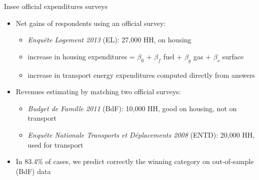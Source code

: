 \documentclass[aspectratio=169,9pt,dvipsnames]{beamer}
\begin{document}
    

\begin{frame}{Insee official expenditures surveys}
    \label{insee}
\begin{itemize}
    \item Net gains of respondents using an official survey: 
    \begin{itemize}
        \item \textit{Enquête Logement 2013} (EL): 27,000 HH, on housing
        \item increase in housing expenditures = $\beta_0$ + $\beta_f$ fuel + $\beta_g$ gas + $\beta_s$ surface \hyperlink{reg_housing}{}
        \item increase in transport energy expenditures computed directly from answers
    \end{itemize}
    \item Revenues estimating by matching two official surveys:
    \begin{itemize}
        \item \textit{Budget de Famille 2011} (BdF): 10,000 HH, good on housing, not on transport
        \item \textit{Enquête Nationale Transports et Déplacements 2008} (ENTD): 20,000 HH, used for transport
    \end{itemize}
    \item In 83.4\% of cases, we predict correctly the winning category on out-of-sample (BdF) data
\end{itemize}
    \end{frame}
\end{document}
